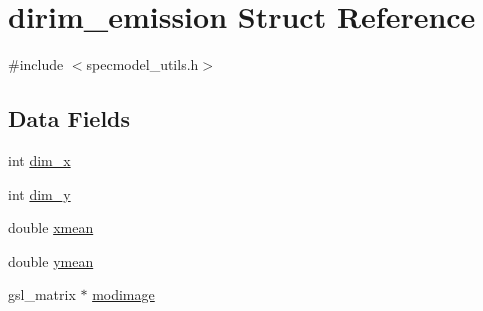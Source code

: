 \hypertarget{structdirim__emission}{
\section{dirim\_\-emission Struct Reference}
\label{structdirim__emission}
}


{\ttfamily \#include $<$specmodel\_\-utils.h$>$}\subsection*{Data Fields}
\begin{DoxyCompactItemize}
\item 
int \hyperlink{structdirim__emission_a4184a616a68e4d92efee811168b9ab7e}{dim\_\-x}
\item 
int \hyperlink{structdirim__emission_a9b3ba1b1264aaae084c69f290f6343e3}{dim\_\-y}
\item 
double \hyperlink{structdirim__emission_a57c2f8cf6dfc3ede582b40f8a63e3eec}{xmean}
\item 
double \hyperlink{structdirim__emission_a95dcd0f591805409a5667874e771597e}{ymean}
\item 
gsl\_\-matrix $\ast$ \hyperlink{structdirim__emission_a8ae8f988a0ad5d4dd23c294c59e81e0e}{modimage}
\end{DoxyCompactItemize}


